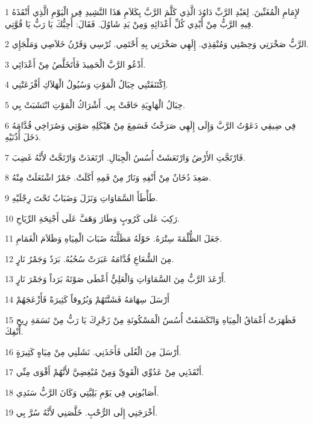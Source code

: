 \par 1 لإِمَامِ الْمُغَنِّينَ. لِعَبْدِ الرَّبِّ دَاوُدَ الَّذِي كَلَّمَ الرَّبَّ بِكَلاَمِ هَذَا النَّشِيدِ فِي الْيَوْمِ الَّذِي أَنْقَذَهُ فِيهِ الرَّبُّ مِنْ أَيْدِي كُلِّ أَعْدَائِهِ وَمِنْ يَدِ شَاوُلَ. فَقَالَ: أُحِبُّكَ يَا رَبُّ يَا قُوَّتِي.
\par 2 الرَّبُّ صَخْرَتِي وَحِصْنِي وَمُنْقِذِي. إِلَهِي صَخْرَتِي بِهِ أَحْتَمِي. تُرْسِي وَقَرْنُ خَلاَصِي وَمَلْجَإِي.
\par 3 أَدْعُو الرَّبَّ الْحَمِيدَ فَأَتَخَلَّصُ مِنْ أَعْدَائِي.
\par 4 اِكْتَنَفَتْنِي حِبَالُ الْمَوْتِ وَسُيُولُ الْهَلاَكِ أَفْزَعَتْنِي.
\par 5 حِبَالُ الْهَاوِيَةِ حَاقَتْ بِي. أَشْرَاكُ الْمَوْتِ انْتَشَبَتْ بِي.
\par 6 فِي ضِيقِي دَعَوْتُ الرَّبَّ وَإِلَى إِلَهِي صَرَخْتُ فَسَمِعَ مِنْ هَيْكَلِهِ صَوْتِي وَصُرَاخِي قُدَّامَهُ دَخَلَ أُذُنَيْهِ.
\par 7 فَارْتَجَّتِ الأَرْضُ وَارْتَعَشَتْ أُسُسُ الْجِبَالِ. ارْتَعَدَتْ وَارْتَجَّتْ لأَنَّهُ غَضِبَ.
\par 8 صَعِدَ دُخَانٌ مِنْ أَنْفِهِ وَنَارٌ مِنْ فَمِهِ أَكَلَتْ. جَمْرٌ اشْتَعَلَتْ مِنْهُ.
\par 9 طَأْطَأَ السَّمَاوَاتِ وَنَزَلَ وَضَبَابٌ تَحْتَ رِجْلَيْهِ.
\par 10 رَكِبَ عَلَى كَرُوبٍ وَطَارَ وَهَفَّ عَلَى أَجْنِحَةِ الرِّيَاحِ.
\par 11 جَعَلَ الظُّلْمَةَ سِتْرَهُ. حَوْلَهُ مَظَلَّتَهُ ضَبَابَ الْمِيَاهِ وَظَلاَمَ الْغَمَامِ.
\par 12 مِنَ الشُّعَاعِ قُدَّامَهُ عَبَرَتْ سُحُبُهُ. بَرَدٌ وَجَمْرُ نَارٍ.
\par 13 أَرْعَدَ الرَّبُّ مِنَ السَّمَاوَاتِ وَالْعَلِيُّ أَعْطَى صَوْتَهُ بَرَداً وَجَمْرَ نَارٍ.
\par 14 أَرْسَلَ سِهَامَهُ فَشَتَّتَهُمْ وَبُرُوقاً كَثِيرَةً فَأَزْعَجَهُمْ
\par 15 فَظَهَرَتْ أَعْمَاقُ الْمِيَاهِ وَانْكَشَفَتْ أُسُسُ الْمَسْكُونَةِ مِنْ زَجْرِكَ يَا رَبُّ مِنْ نَسَمَةِ رِيحِ أَنْفِكَ.
\par 16 أَرْسَلَ مِنَ الْعُلَى فَأَخَذَنِي. نَشَلَنِي مِنْ مِيَاهٍ كَثِيرَةٍ.
\par 17 أَنْقَذَنِي مِنْ عَدُوِّي الْقَوِيِّ وَمِنْ مُبْغِضِيَّ لأَنَّهُمْ أَقْوَى مِنِّي.
\par 18 أَصَابُونِي فِي يَوْمِ بَلِيَّتِي وَكَانَ الرَّبُّ سَنَدِي.
\par 19 أَخْرَجَنِي إِلَى الرُّحْبِ. خَلَّصَنِي لأَنَّهُ سُرَّ بِي.
